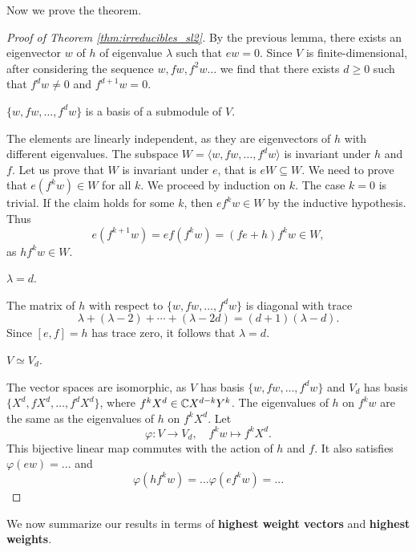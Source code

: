 Now we prove the theorem.

\begin{proof}[Proof of Theorem \ref{thm:irreducibles_sl2}]
    By the previous lemma, there exists an eigenvector $w$ 
    of $h$ of eigenvalue $\lambda$ such that $ew=0$. Since $V$ is finite-dimensional, 
    after considering
    the sequence $w,fw,f^2w\dots$ we find that there
    exists $d\geq0$ such that 
    $f^dw\ne 0$ and $f^{d+1}w=0$. 
    
    \begin{claim}
        $\{w,fw,\dots,f^dw\}$ is a basis of a submodule of $V$.
    \end{claim}
    
    The elements are linearly independent, as they are eigenvectors of $h$ with 
    different eigenvalues. The subspace $W=\langle w,fw,\dots,f^dw\rangle$ 
    is invariant under $h$ and $f$. Let us prove that $W$ is invariant 
    under $e$, that is $eW\subseteq W$. We need to prove that
    $e(f^kw)\in W$ for all $k$. We proceed by induction on $k$. 
    The case $k=0$ is trivial. 
    If the claim holds for some $k$, then $ef^kw\in W$ by 
    the inductive hypothesis. Thus 
    \[
    e(f^{k+1}w)=ef(f^{k}w)=(fe+h)f^{k}w\in W,
    \]
    as $hf^kw\in W$. 
    
    \begin{claim}
        $\lambda=d$. 
    \end{claim}
    
    The matrix of $h$ with respect to $\{w,fw,\dots,f^dw\}$ 
    is diagonal with trace 
    \[
    \lambda+(\lambda-2)+\cdots+(\lambda-2d)=(d+1)(\lambda-d).
    \]
    Since $[e,f]=h$ has trace zero, it follows that $\lambda=d$. 
    
    \begin{claim}
        $V\simeq V_d$.
    \end{claim}
    
    The vector spaces are isomorphic, as $V$ has basis $\{w,fw,\dots,f^dw\}$ and 
    $V_d$ has basis $\{X^d,fX^d,\dots,f^dX^d\}$, where
    $f^kX^d\in\mathbb{C} X^{d-k}Y^k$. The eigenvalues of $h$ on $f^kw$ 
    are the same as the eigenvalues of $h$ on $f^kX^d$. Let 
    \[
    \varphi\colon V\to V_d,\quad
    f^kw\mapsto f^kX^d.
    \]
    This bijective linear map commutes with the action of $h$ and $f$. 
    It also satisfies $\varphi(ew)=...$
    and 
    \[
    \varphi(hf^kw)=...
    \varphi(ef^kw)=...
    \]
\end{proof}

We now summarize our results in terms of \textbf{highest weight vectors}
and \textbf{highest weights}.

